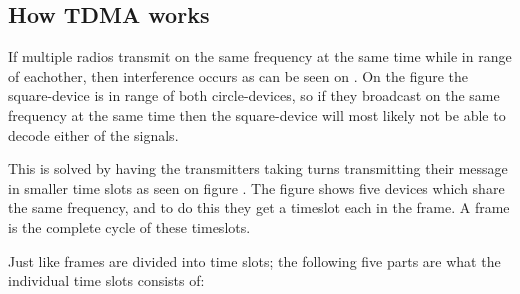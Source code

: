 \subsection{How TDMA works}

If multiple radios transmit on the same frequency at the same time while in range of eachother, then interference occurs as can be seen on . 
On the figure the square-device is in range of both circle-devices, so if they broadcast on the same frequency at the same time then the square-device will most likely not be able to decode either of the signals.\cite{networkencyclopedia2013time, networkencyclopedia2013advanced}



This is solved by having the transmitters taking turns transmitting their message in smaller time slots as seen on figure .
The figure shows five devices which share the same frequency, and to do this they get a timeslot each in the frame.
A frame is the complete cycle of these timeslots.


Just like frames are divided into time slots; the following five parts are what the individual time slots consists of:

